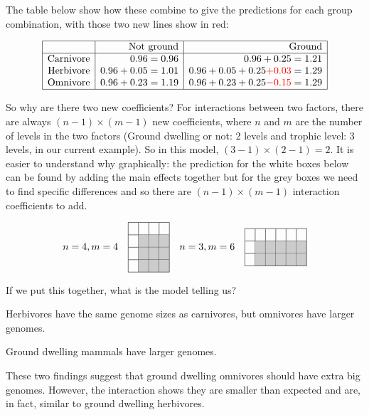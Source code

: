 The table below show how these combine to give the predictions for each 
group combination, with those two new lines show in red:

\[\begin{array}{|r|r|r|}
\hline
 & \textrm{Not ground} &  \textrm{Ground} \\
\hline
\textrm{Carnivore} & 0.96 = 0.96 &  0.96+0.25=1.21 \\
\textrm{Herbivore} & 0.96 + 0.05 = 1.01 & 0.96+0.05+0.25{\color{red}+0.03}=1.29\\
\textrm{Omnivore} & 0.96 + 0.23 = 1.19 & 0.96+0.23+0.25{\color{red}-0.15}=1.29\\
\hline
\end{array}\]

So why are there two new coefficients? For interactions between two 
factors, there are always $(n-1)\times(m-1)$ new coefficients, where 
$n$ and $m$ are the number of levels in the two factors (Ground dwelling or not: 2 levels and trophic level: 3 levels, in our current example). So in this model, $(3-1) \times (2-1) =2$. It is easier to understand why graphically: 
the prediction for the white boxes below can be found by adding the 
main effects together but for the grey boxes we need to find specific 
differences and so there are $(n-1)\times(m-1)$ interaction 
coefficients to add.

\[
n=4,m=4\quad
\begin{array}{|c|c|c|c|}
\hline
 & & & \\ 
\hline
 & \gc & \gc  &  \gc \\ 
\hline
 & \gc  & \gc  & \gc \\ 
\hline
 &  \gc &  \gc & \gc \\ 
\hline
\end{array}
\quad n=3,m=6 \quad
\begin{array}{|c|c|c|c|c|c|}
\hline
 & & & & &\\ 
\hline
 & \gc & \gc  &  \gc &  \gc &  \gc \\ 
\hline
 & \gc  & \gc  & \gc  &  \gc &  \gc\\ 
\hline
\end{array}
\]

If we put this together, what is the model telling us? 
\begin{compactitem}
\item Herbivores have the same genome sizes as carnivores, but 
omnivores have larger genomes.
\item Ground dwelling mammals have larger genomes.
\item These two findings suggest that ground dwelling omnivores should 
have extra big genomes. However, the interaction shows they are smaller 
than expected and are, in fact, similar to ground dwelling herbivores.
\end{compactitem}


